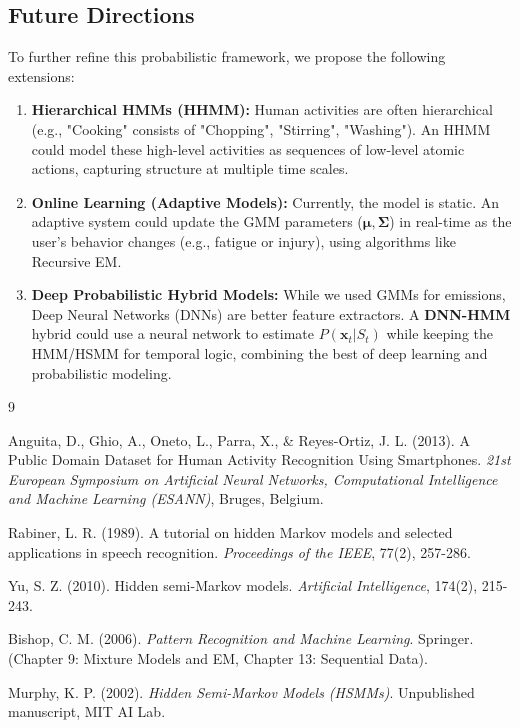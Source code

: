\documentclass[11pt,a4paper]{article}
\newcommand{\bx}{\mathbf{x}}
\newcommand{\bmu}{\boldsymbol{\mu}}
\newcommand{\bSigma}{\boldsymbol{\Sigma}}
\begin{document}
\subsection{Future Directions}
To further refine this probabilistic framework, we propose the following extensions:
\begin{enumerate}
    \item \textbf{Hierarchical HMMs (HHMM):}
    Human activities are often hierarchical (e.g., "Cooking" consists of "Chopping", "Stirring", "Washing"). An HHMM could model these high-level activities as sequences of low-level atomic actions, capturing structure at multiple time scales.
    
    \item \textbf{Online Learning (Adaptive Models):}
    Currently, the model is static. An adaptive system could update the GMM parameters ($\bmu, \bSigma$) in real-time as the user's behavior changes (e.g., fatigue or injury), using algorithms like Recursive EM.
    
    \item \textbf{Deep Probabilistic Hybrid Models:}
    While we used GMMs for emissions, Deep Neural Networks (DNNs) are better feature extractors. A \textbf{DNN-HMM} hybrid could use a neural network to estimate $P(\bx_t | S_t)$ while keeping the HMM/HSMM for temporal logic, combining the best of deep learning and probabilistic modeling.
\end{enumerate}

\begin{thebibliography}{9}

Anguita, D., Ghio, A., Oneto, L., Parra, X., \& Reyes-Ortiz, J. L. (2013). 
A Public Domain Dataset for Human Activity Recognition Using Smartphones. 
\textit{21st European Symposium on Artificial Neural Networks, Computational Intelligence and Machine Learning (ESANN)}, Bruges, Belgium.

Rabiner, L. R. (1989). 
A tutorial on hidden Markov models and selected applications in speech recognition. 
\textit{Proceedings of the IEEE}, 77(2), 257-286.

Yu, S. Z. (2010). 
Hidden semi-Markov models. 
\textit{Artificial Intelligence}, 174(2), 215-243.

Bishop, C. M. (2006). 
\textit{Pattern Recognition and Machine Learning}. 
Springer. (Chapter 9: Mixture Models and EM, Chapter 13: Sequential Data).

Murphy, K. P. (2002). 
\textit{Hidden Semi-Markov Models (HSMMs)}. 
Unpublished manuscript, MIT AI Lab.

\end{thebibliography}
\end{document}
